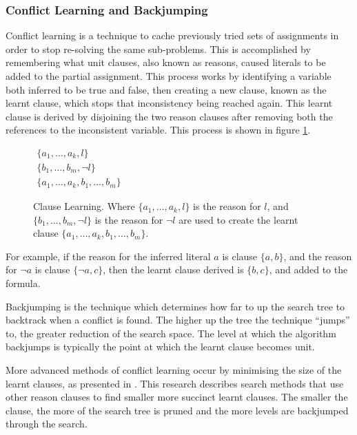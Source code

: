 \subsubsection{Conflict Learning and Backjumping}
Conflict learning \citep{stallman1976} is a technique to cache previously tried sets of assignments in order to stop re-solving the same sub-problems.
This is accomplished by remembering what unit clauses, also known as reasons, caused literals to be added to the partial assignment. 
This process works by identifying a variable both inferred to be true and false,
then creating a new clause, known as the learnt clause, which stops that inconsistency being reached again.
This learnt clause is derived by disjoining the two reason clauses after removing both the references to the inconsistent variable.
This process is shown in figure \ref{impl.clauselearning}. 

\begin{figure}[htp]
\begin{center}
$\begin{array}{c}
\{a_1,\ldots,a_k, l\} \\
 \{b_1,\ldots,b_m,\neg l\}\\
\hline
\{a_1,\ldots,a_k, b_1,\ldots,b_m \}
\end{array}$
  \caption{Clause Learning. Where $\{a_1,\ldots,a_k, l\}$ is the reason for $l$, and $\{b_1,\ldots,b_m,\neg l\}$ is the reason for $\neg l$
   are used to create the learnt clause $\{a_1,\ldots,a_k, b_1,\ldots,b_m \}$.}
  \label{impl.clauselearning}
\end{center}
\end{figure}

For example, if the reason for the inferred literal $a$ is clause $\{a, b\}$, and the reason for $\neg a$ is clause $\{\neg a, c\}$,
then the learnt clause derived is $\{b,c\}$, and added to the formula.

Backjumping \citep{Gaschnig1979} is the technique which determines how far to up the search tree to backtrack when a conflict is found.
The higher up the tree the technique ``jumps'' to, the greater reduction of the search space.
The level at which the algorithm backjumps is typically the point at which the learnt clause becomes unit. 

More advanced methods of conflict learning occur by minimising the size of the learnt clauses, as presented in \citep{sorensson2009}.
This research describes search methods that use other reason clauses to find smaller more succinct learnt clauses.
The smaller the clause, the more of the search tree is pruned and the more levels are backjumped through the search.

